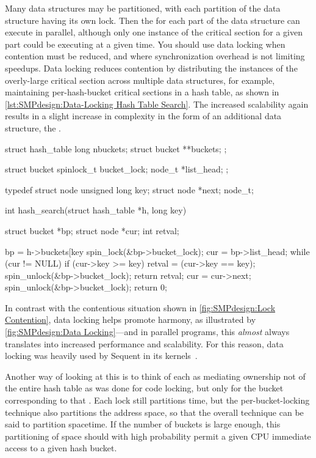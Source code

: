 Many data structures may be partitioned,
with each partition of the data structure having its own lock.
Then the  for each part of the data structure
can execute in parallel,
although only one instance of the critical section for a given
part could be executing at a given time.
You should use data locking when contention must
be reduced, and where synchronization overhead is not
limiting speedups.
Data locking reduces contention by distributing the instances
of the overly-large critical section across multiple data structures,
for example, maintaining per-hash-bucket critical sections in a
hash table, as shown in
\cref{lst:SMPdesign:Data-Locking Hash Table Search}.
The increased scalability again results in a slight increase in complexity
in the form of an additional data structure, the .

\begin{listing}
\begin{VerbatimL}
struct hash_table
{
	long nbuckets;
	struct bucket **buckets;
};

struct bucket {
	spinlock_t bucket_lock;
	node_t *list_head;
};

typedef struct node {
	unsigned long key;
	struct node *next;
} node_t;

int hash_search(struct hash_table *h, long key)
{
	struct bucket *bp;
	struct node *cur;
	int retval;

	bp = h->buckets[key %
	spin_lock(&bp->bucket_lock);
	cur = bp->list_head;
	while (cur != NULL) {
		if (cur->key >= key) {
			retval = (cur->key == key);
			spin_unlock(&bp->bucket_lock);
			return retval;
		}
		cur = cur->next;
	}
	spin_unlock(&bp->bucket_lock);
	return 0;
}
\end{VerbatimL}
\caption{Data-Locking Hash Table Search}
\label{lst:SMPdesign:Data-Locking Hash Table Search}
\end{listing}

In contrast with the contentious situation
shown in \cref{fig:SMPdesign:Lock Contention},
data locking helps promote harmony, as illustrated by
\cref{fig:SMPdesign:Data Locking}---and in parallel programs,
this \emph{almost} always translates into increased performance and
scalability.
For this reason, data locking was heavily used by Sequent in its
kernels~\cite{Beck85,Inman85,Garg90,Dove90,McKenney92b,McKenney92a,McKenney93}.

Another way of looking at this is to think of each 
as mediating ownership not of the entire hash table as was done for code
locking, but only for the bucket corresponding to that .
Each lock still partitions time, but the per-bucket-locking technique
also partitions the address space, so that the overall technique can be
said to partition spacetime.
If the number of buckets is large enough, this partitioning of space
should with high probability permit a given CPU immediate access to
a given hash bucket.

